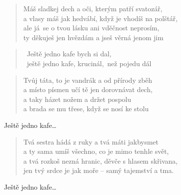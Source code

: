 \begin{song}{}
\begin{verse}
   Máš sladkej dech a oči, kterým patří svatozář, \\
   a vlasy máš jak hedvábí, když je vhodíš na polštář, \\
   ale já~se o tvou lásku ani vděčnost neprosím, \\
   ty děkuješ jen hvězdám a jseš věrná jenom jim
\end{verse}
\begin{verse}
   ~Ještě jedno kafe bych si dal, \\
   ~ještě jedno kafe, krucinál,~než pojedu dál 
\end{verse}
\begin{verse}
   Tvůj táta, to je vandrák a od přírody zběh  \\
   a místo písmen učí tě jen dorovnávat dech, \\
   a taky házet nožem a držet pospolu \\
   a brada se mu třese, když se nosí ke stolu
\end{verse}
\begin{refren}
   Ještě jedno kafe\ldots
\end{refren}
\begin{verse}
   Tvá sestra hádá z ruky a tvá máti jakbysmet \\
   a ty sama umíš všechno, co je mimo tenhle svět, \\
   a tvá rozkoš nezná hranic, děvče s hlasem skřivana, \\
   jen tvý srdce je jak moře -- samý tajemství a tma.
\end{verse}
\begin{refren}
   Ještě jedno kafe\ldots
\end{refren}
\end{song}
\pagebreak
